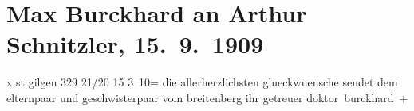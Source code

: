 

         
         \renewcommand{\erwaehntePersonen}{Personen: Olga Schnitzler, Heinrich Schnitzler, Lili Schnitzler}
         \renewcommand{\erwaehnteOrte}{Orte: Breitenberg, St. Gilgen, Wien}
         \renewcommand{\erwaehnteWerke}{}
               \section[Max Burckhard an Arthur Schnitzler, 15. 9. 1909]{ Max Burckhard an Arthur Schnitzler, 15. 9. 1909}\nopagebreak{}\rehead{ }\begin{ledgroupsized}[t]{13cm}\normalsize\beginnumbering \toendnotes[C]{\smallbreak\pagebreak[2]} 
\toendnotes[C]{\smallbreak}\pstart
           {\pb}x st
                     gilgen 329 21/20 15{ }3 10=\pend
           \pstart
           die allerherzlichsten glueckwuensche sendet dem elternpaar und geschwisterpaar vom breitenberg ihr getreuer \spacefill\mbox{doktor burckhard +}\pend
           
         
         \endnumbering{}\end{ledgroupsized}  \newcommand{\dateiname}{L01875}\newcommand{\titel}{Max Burckhard an Arthur Schnitzler, 15. 9. 1909}\newcommand{\editorInnen}{Martin Anton Müller und Gerd-Hermann Susen}
      